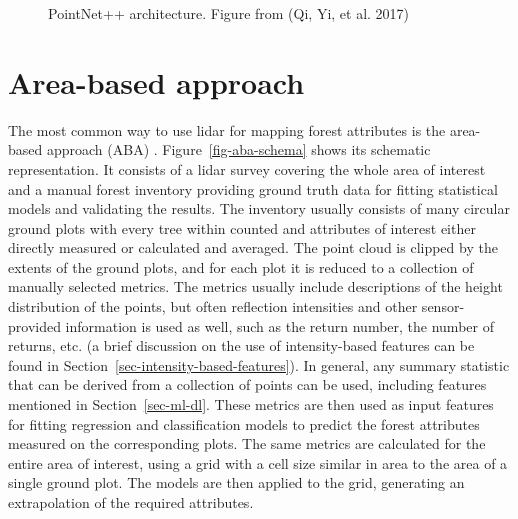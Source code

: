\begin{figure}
\caption[PointNet++ architecture]{\label{fig-pointnet2-architecture}PointNet++ architecture.
Figure from (Qi, Yi, et al. 2017)}
\end{figure}

\section{Area-based approach}\label{sec-area-based-approach}

The most common way to use \gls{lidar} for mapping forest attributes is the area-based approach (ABA) \citep{whiteABAGuide2013}.
Figure~\ref{fig-aba-schema} shows its schematic representation.
It consists of a \gls{lidar} survey covering the whole area of interest and a manual forest inventory providing ground truth data for fitting statistical models and validating the results.
The inventory usually consists of many circular ground plots with every tree within counted and attributes of interest either directly measured or calculated and averaged.
The point cloud is clipped by the extents of the ground plots, and for each plot it is reduced to a collection of manually selected metrics.
The metrics usually include descriptions of the height distribution of the points, but often reflection intensities and other sensor-provided information is used as well, such as the return number, the number of returns, etc. (a brief discussion on the use of intensity-based features can be found in Section~\ref{sec-intensity-based-features}).
In general, any summary statistic that can be derived from a collection of points can be used, including features mentioned in Section~\ref{sec-ml-dl}.
These metrics are then used as input features for fitting regression and classification models to predict the forest attributes measured on the corresponding plots.
The same metrics are calculated for the entire area of interest, using a grid with a cell size similar in area to the area of a single ground plot.
The models are then applied to the grid, generating an extrapolation of the required attributes.

